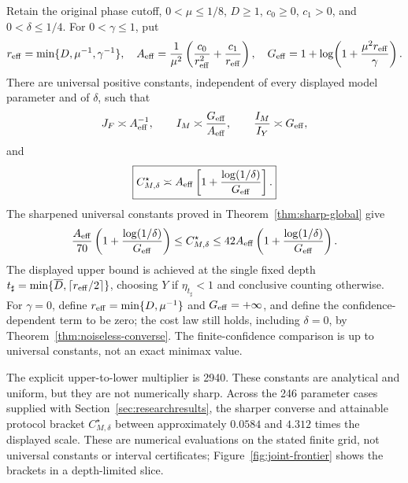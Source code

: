 \begin{theorem}
\label{thm:uniform-cost}
Retain the original phase cutoff, $0<\mu\leq1/8$, $D\geq1$,
$c_0\geq0$, $c_1>0$, and $0<\delta\leq1/4$. For $0<\gamma\leq1$, put
\begin{equation}\label{eq:joint-scales}
 r_{\mathrm{eff}}=\min\{D,\mu^{-1},\gamma^{-1}\},\quad
 A_{\rm eff}=\frac1{\mu^2}
       \left(\frac{c_0}{r_{\mathrm{eff}}^2}+\frac{c_1}{r_{\mathrm{eff}}}\right),\quad
 G_{\rm eff}=1+\log\!\left(1+\frac{\mu^2r_{\mathrm{eff}}}{\gamma}\right).
\end{equation}
There are universal positive constants, independent of every displayed
model parameter and of $\delta$, such that
\begin{equation}\label{eq:uniform-rates}
 J_F\asymp A_{\rm eff}^{-1},\qquad
 I_M\asymp\frac{G_{\rm eff}}{A_{\rm eff}},\qquad
 \frac{I_M}{I_Y}\asymp G_{\rm eff},
\end{equation}
and
\begin{equation}\label{eq:uniform-cost}
 \boxed{\displaystyle
 C_{M,\delta}^\star\asymp A_{\rm eff}
       \left[1+\frac{\log(1/\delta)}{G_{\rm eff}}\right].}
\end{equation}
The sharpened universal constants proved in Theorem~\ref{thm:sharp-global} give
\begin{equation}\label{eq:explicit-uniform-constants}
 \frac{A_{\rm eff}}{70}
 \left(1+\frac{\log(1/\delta)}{G_{\rm eff}}\right)
 \leq C_{M,\delta}^\star\leq
 42 A_{\rm eff}\left(1+\frac{\log(1/\delta)}{G_{\rm eff}}\right).
\end{equation}
The displayed upper bound is achieved at the single fixed depth
$t_\sharp=\min\{\overline D,\lceil r_{\mathrm{eff}}/2\rceil\}$, choosing $Y$ if
$\eta_{t_\sharp}<1$ and conclusive counting otherwise. For $\gamma=0$,
define $r_{\mathrm{eff}}=\min\{D,\mu^{-1}\}$ and $G_{\rm eff}=+\infty$,
and define the confidence-dependent term to be zero;
the cost law still holds, including $\delta=0$, by
Theorem~\ref{thm:noiseless-converse}. The finite-confidence comparison
is up to universal constants, not an exact minimax value.
\end{theorem}

The explicit upper-to-lower multiplier is 2940. These constants are
analytical and uniform, but they are not numerically sharp. Across the 246 parameter cases supplied with
Section~\ref{sec:researchresults}, the sharper converse and attainable
protocol bracket $C_{M,\delta}^\star$ between approximately $0.0584$ and
$4.312$ times the displayed scale. These are numerical evaluations on
the stated finite grid, not universal constants or interval certificates;
Figure~\ref{fig:joint-frontier} shows the brackets in a depth-limited slice.

